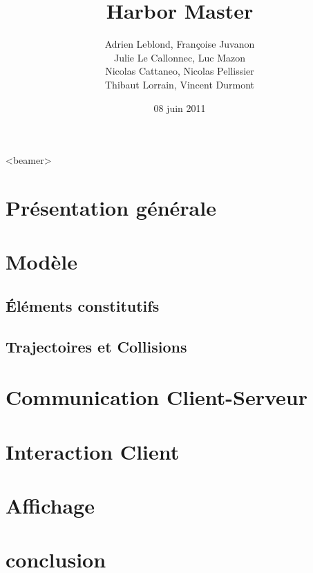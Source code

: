\documentclass{beamer}
\author[Adrien, Françoise, Julie, Luc, Nico*2, Thibaut, Vincent]{Adrien Leblond, Françoise Juvanon \\ Julie Le Callonnec, Luc Mazon \\ Nicolas Cattaneo, Nicolas Pellissier \\ Thibaut Lorrain, Vincent Durmont}
\title[Harbor Master]{Harbor Master}
\date{08 juin 2011}
\begin{document}
\begin{frame}<beamer>%
  \titlepage
  ~\newline
  ~\newline
  ~\newline
  ~\newline
  ~\newline
  ~\newline
\end{frame}




\begin{frame}[c]
  \tableofcontents%
\end{frame}


\section{Présentation générale}
\begin{frame}[c]
\end{frame}




\section{Modèle}
\subsection{Éléments constitutifs}


\subsection{Trajectoires et Collisions}


\section{Communication Client-Serveur}


\section{Interaction Client}


\section{Affichage}


\section{conclusion}

\end{document}
